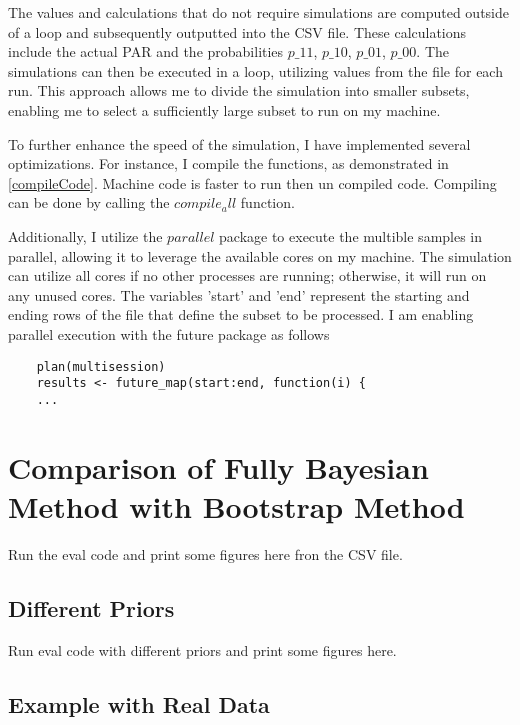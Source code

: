The values and calculations that do not require simulations are computed outside of a loop and subsequently outputted into the CSV file. These calculations include the actual PAR and the probabilities $p\_11$, $p\_10$, $p\_01$, $p\_00$. The simulations can then be executed in a loop, utilizing values from the file for each run. This approach allows me to divide the simulation into smaller subsets, enabling me to select a sufficiently large subset to run on my machine.

To further enhance the speed of the simulation, I have implemented several optimizations. For instance, I compile the functions, as demonstrated in \ref{compileCode}. Machine code is faster to run then un compiled code. Compiling can be done by calling the $compile_all$ function.

Additionally, I utilize the $parallel$ package to execute the multible samples in parallel, allowing it to leverage the available cores on my machine. The simulation can utilize all cores if no other processes are running; otherwise, it will run on any unused cores. The variables 'start' and 'end' represent the starting and ending rows of the file that define the subset to be processed. I am enabling parallel execution with the future package as follows

\begin{lstlisting}
    plan(multisession)
    results <- future_map(start:end, function(i) {
    ...
\end{lstlisting}

\section{Comparison of Fully Bayesian Method with Bootstrap Method}
Run the eval code and print some figures here fron the CSV file.

\subsection{Different Priors}
Run eval code with different priors and print some figures here.

\subsection{Example with Real Data}

